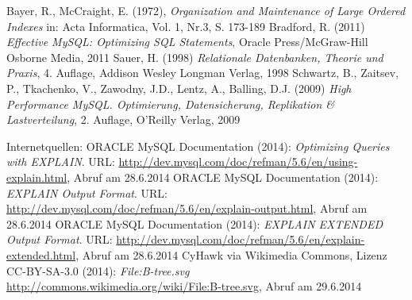 \newpage
{}
  \begin{thebibliography}{}



	 Bayer, R., McCraight,  E. (1972), {\sl Organization and Maintenance of Large Ordered Indexes}
	     in: Acta Informatica, Vol. 1, Nr.3, S. 173-189
     Bradford, R. (2011) {\sl Effective MySQL: Optimizing SQL Statements}, Oracle Press/McGraw-Hill Osborne Media, 2011
     Sauer, H. (1998) {\sl Relationale Datenbanken, Theorie und Praxis}, 4. Auflage, Addison Wesley Longman Verlag, 1998
     Schwartz, B., Zaitsev, P., Tkachenko, V., Zawodny, J.D., Lentz, A., Balling, D.J. (2009) 
        {\sl High Performance MySQL. Optimierung, Datensicherung, Replikation \& Lastverteilung}, 2. Auflage,  O'Reilly Verlag, 2009
	
	Internetquellen:
	 ORACLE MySQL Documentation (2014): {\sl Optimizing Queries with EXPLAIN}. URL: 
	\url{http://dev.mysql.com/doc/refman/5.6/en/using-explain.html}, Abruf am 28.6.2014
     ORACLE MySQL Documentation (2014): {\sl EXPLAIN Output Format}. URL: \url{http://dev.mysql.com/doc/refman/5.6/en/explain-output.html}, Abruf am 28.6.2014
	 ORACLE MySQL Documentation (2014): {\sl EXPLAIN EXTENDED Output Format}. URL:
	\url{http://dev.mysql.com/doc/refman/5.6/en/explain-extended.html}, Abruf am 28.6.2014
	 CyHawk via Wikimedia Commons, Lizenz CC-BY-SA-3.0 (2014): {\sl File:B-tree.svg}
	\url{http://commons.wikimedia.org/wiki/File:B-tree.svg}, Abruf am 29.6.2014

  \end{thebibliography}
